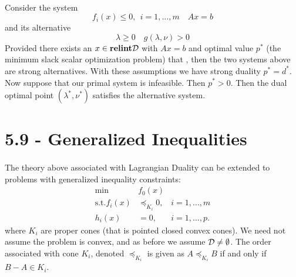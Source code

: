 \documentclass[letterpaper,12pt,oneside,onecolumn]{article}
\begin{document}
\paragraph{}
Consider the system
$$f_i(x) \leq 0,\ \ i=1,\dots,m \quad Ax=b $$
and its alternative
$$\lambda \geq 0 \quad g(\lambda, \nu) > 0$$
Provided there exists an $x \in \textbf{relint} \mathcal{D}$ with $Ax = b$ and optimal value $p^*$ (the minimum slack scalar optimization problem) that , then the two systems above are strong alternatives. With these assumptions we have strong duality $p^*=d^*$. Now suppose that our primal system is infeasible. Then $p^* > 0$. Then the dual optimal point $(\lambda^*, \nu^*)$ satisfies the alternative system.
\section*{5.9 - Generalized Inequalities}
\paragraph{}
The theory above associated with Lagrangian Duality can be extended to problems with generalized inequality constraints:
\begin{align*}
\min &f_0(x) \\
\text{s.t.} f_i(x) &\preccurlyeq_{K_i} 0, &i=1,\dots,m \\
h_i(x) & = 0, &i=1,\dots,p.
\end{align*}
where $K_i$ are proper cones (that is pointed closed convex cones). We need not assume the problem is convex, and as before we assume $\mathcal{D} \neq \emptyset$. The order associated with cone $K_i$, denoted $\preccurlyeq_{K_i}$ is given as $A \preccurlyeq_{K_i} B$ if and only if $B-A \in K_i$.
\end{document}
